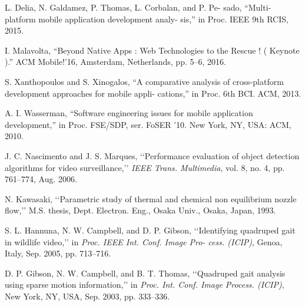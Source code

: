 \documentclass[14pt,a4paper,final]{extreport}
\begin{document}
\begin{thebibliography}{9}
{\fontsize{13pt}{8.4pt}\selectfont L. Delia, N. Galdamez, P. Thomas, L. Corbalan, and P. Pe- sado, “Multi-platform mobile application development analy- sis,” in Proc. IEEE 9th RCIS, 2015.\par}\par

{\fontsize{13pt}{8.4pt}\selectfont I. Malavolta, “Beyond Native Apps : Web Technologies to the Rescue ! ( Keynote ).” ACM Mobile!’16, Amsterdam, Netherlands, pp. 5–6, 2016.\par}\par

{\fontsize{13pt}{8.4pt}\selectfont S. Xanthopoulos and S. Xinogalos, “A comparative analysis of cross-platform development approaches for mobile appli- cations,” in Proc. 6th BCI. ACM, 2013.\par}\par

{\fontsize{13pt}{8.4pt}\selectfont A. I. Wasserman, “Software engineering issues for mobile application development,” in Proc. FSE/SDP, ser. FoSER ’10. New York, NY, USA: ACM, 2010.\par}\par

{\fontsize{13pt}{8.4pt}\selectfont J. C. Nascimento and J. S. Marques, ‘‘Performance evaluation of object detection algorithms for video surveillance,’’ \textit{IEEE Trans. Multimedia}, vol. 8, no. 4, pp. 761–774, Aug. 2006.\par}\par

{\fontsize{13pt}{8.4pt}\selectfont N. Kawasaki, ‘‘Parametric study of thermal and chemical non equilibrium nozzle flow,’’ M.S. thesis, Dept. Electron. Eng., Osaka Univ., Osaka, Japan, 1993.\par}\par

{\fontsize{13pt}{8.4pt}\selectfont S. L. Hannuna, N. W. Campbell, and D. P. Gibson, ‘‘Identifying quadruped gait in wildlife video,’’ in \textit{Proc. IEEE Int. Conf. Image Pro- cess. (ICIP)}, Genoa, Italy, Sep. 2005, pp. 713–716.\par}\par

{\fontsize{13pt}{8.4pt}\selectfont D. P. Gibson, N. W. Campbell, and B. T. Thomas, ‘‘Quadruped gait analysis using sparse motion information,’’ in \textit{Proc. Int. Conf. Image Process. (ICIP)}, New York, NY, USA, Sep. 2003, pp. 333–336.\par}\par


\end{thebibliography}
\end{document}
